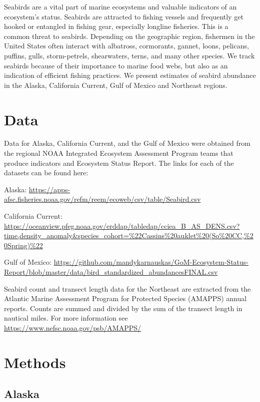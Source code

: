 \documentclass[
]{book}
\begin{document}
Seabirds are a vital part of marine ecosystems and valuable indicators of an ecosystem's status. Seabirds are attracted to fishing vessels and frequently get hooked or entangled in fishing gear, especially longline fisheries. This is a common threat to seabirds. Depending on the geographic region, fishermen in the United States often interact with albatross, cormorants, gannet, loons, pelicans, puffins, gulls, storm-petrels, shearwaters, terns, and many other species. We track seabirds because of their importance to marine food webs, but also as an indication of efficient fishing practices. We present estimates of seabird abundance in the Alaska, California Current, Gulf of Mexico and Northeast regions.

\hypertarget{data-4}{%
\section{Data}\label{data-4}}

Data for Alaska, California Current, and the Gulf of Mexico were obtained from the regional NOAA Integrated Ecosystem Assessment Program teams that produce indicators and Ecosystem Status Report. The links for each of the datasets can be found here:

Alaska: \url{https://apps-afsc.fisheries.noaa.gov/refm/reem/ecoweb/csv/table/Seabird.csv}

California Current: \url{https://oceanview.pfeg.noaa.gov/erddap/tabledap/cciea_B_AS_DENS.csv?time,density_anomaly\&species_cohort=\%22Cassins\%20auklet\%20(So\%20CC,\%20Spring)\%22}

Gulf of Mexico: \url{https://github.com/mandykarnauskas/GoM-Ecosystem-Status-Report/blob/master/data/bird_standardized_abundancesFINAL.csv}

Seabird count and transect length data for the Northeast are extracted from the Atlantic Marine Assessment Program for Protected Species (AMAPPS) annual reports. Counts are summed and divided by the sum of the transect length in nautical miles. For more information see \url{https://www.nefsc.noaa.gov/psb/AMAPPS/}

\hypertarget{methods-4}{%
\section{Methods}\label{methods-4}}

\hypertarget{alaska-2}{%
\subsection{Alaska}\label{alaska-2}}
\end{document}
